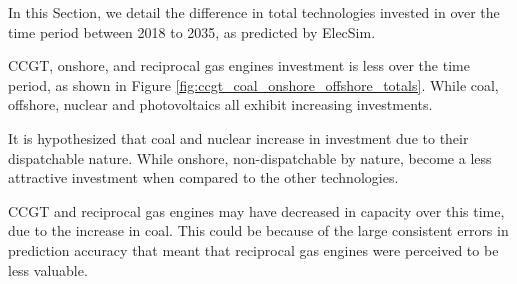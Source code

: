 \documentclass[final,3p,times,twocolumn,numbers]{elsarticle}
\begin{document}
In this Section, we detail the difference in total technologies invested in over the time period between 2018 to 2035, as predicted by ElecSim.

CCGT, onshore, and reciprocal gas engines investment is less over the time period, as shown in Figure \ref{fig:ccgt_coal_onshore_offshore_totals}. While coal, offshore, nuclear and photovoltaics all exhibit increasing investments.

It is hypothesized that coal and nuclear increase in investment due to their dispatchable nature. While onshore, non-dispatchable by nature, become a less attractive investment when compared to the other technologies.

CCGT and reciprocal gas engines may have decreased in capacity over this time, due to the increase in coal. This could be because of the large consistent errors in prediction accuracy that meant that reciprocal gas engines were perceived to be less valuable.


\end{document}
